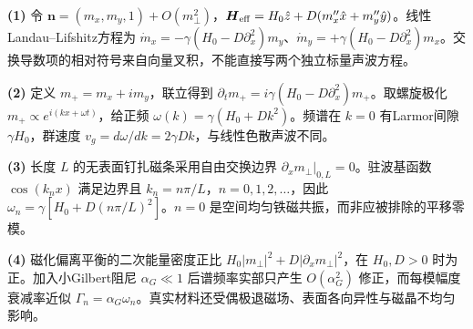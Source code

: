 \par\noindent\textbf{(1)} 令 \(\boldsymbol n=(m_x,m_y,1)+O(m_\perp^2)\)，\(\boldsymbol H_{\rm eff}=H_0\hat z+D(m_x''\hat x+m_y''\hat y)\)。线性Landau–Lifshitz方程为 \(\dot m_x=-\gamma(H_0-D\partial_x^2)m_y\)、\(\dot m_y=+\gamma(H_0-D\partial_x^2)m_x\)。交换导数项的相对符号来自向量叉积，不能直接写两个独立标量声波方程。
\par\noindent\textbf{(2)} 定义 \(m_+=m_x+i m_y\)，联立得到 \(\partial_t m_+=i\gamma(H_0-D\partial_x^2)m_+\)。取螺旋极化 \(m_+\propto e^{i(kx+\omega t)}\)，给正频 \(\omega(k)=\gamma(H_0+Dk^2)\)。频谱在 \(k=0\) 有Larmor间隙 \(\gamma H_0\)，群速度 \(v_g=d\omega/dk=2\gamma Dk\)，与线性色散声波不同。
\par\noindent\textbf{(3)} 长度 \(L\) 的无表面钉扎磁条采用自由交换边界 \(\partial_xm_\perp|_{0,L}=0\)。驻波基函数 \(\cos(k_nx)\) 满足边界且 \(k_n=n\pi/L\)，\(n=0,1,2,\dots\)，因此 \(\omega_n=\gamma[H_0+D(n\pi/L)^2]\)。\(n=0\) 是空间均匀铁磁共振，而非应被排除的平移零模。
\par\noindent\textbf{(4)} 磁化偏离平衡的二次能量密度正比 \(H_0|m_\perp|^2+D|\partial_xm_\perp|^2\)，在 \(H_0,D>0\) 时为正。加入小Gilbert阻尼 \(\alpha_G\ll1\) 后谱频率实部只产生 \(O(\alpha_G^2)\) 修正，而每模幅度衰减率近似 \(\Gamma_n=\alpha_G\omega_n\)。真实材料还受偶极退磁场、表面各向异性与磁晶不均匀影响。
